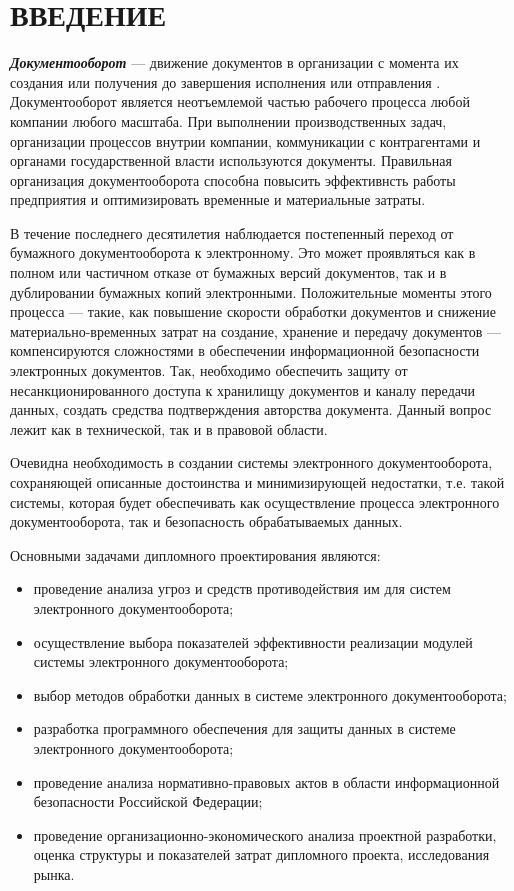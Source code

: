\chapter*{ВВЕДЕНИЕ}							%

\textbf{\textit{Документооборот}} --- движение документов в организации с момента их создания или получения до завершения исполнения или отправления \cite{gost51141}.
Документооборот является неотъемлемой частью рабочего процесса любой компании любого масштаба. При выполнении производственных задач, организации процессов внутрии компании, коммуникации с контрагентами и органами государственной власти используются документы. Правильная организация документооборота способна повысить эффективнсть работы предприятия и оптимизировать временные и материальные затраты.

\vspace{\baselineskip}
В течение последнего десятилетия наблюдается постепенный переход от бумажного документооборота к электронному. Это может проявляться как в полном или частичном отказе от бумажных версий документов, так и в дублировании бумажных копий электронными. Положительные моменты этого процесса --- такие, как повышение скорости обработки документов и снижение материально-временных затрат на создание, хранение и передачу документов --- компенсируются сложностями в обеспечении информационной безопасности электронных документов. Так, необходимо обеспечить защиту от несанкционированного доступа к хранилищу документов и каналу передачи данных, создать средства подтверждения авторства документа. Данный вопрос лежит как в технической, так и в правовой области.

\vspace{\baselineskip}
Очевидна необходимость в создании системы электронного документооборота, сохраняющей описанные достоинства и минимизирующей недостатки, т.е. такой системы, которая будет обеспечивать как осуществление процесса электронного документооборота, так и безопасность обрабатываемых данных.

\vspace{\baselineskip}
Основными задачами дипломного проектирования являются:
\begin{itemize}
  \item проведение анализа угроз и средств противодействия им для систем электронного документооборота;
  \item осуществление выбора показателей эффективности реализации модулей системы электронного документооборота;
  \item выбор методов обработки данных в системе электронного документооборота;
  \item разработка программного обеспечения для защиты данных в системе электронного документооборота;
  \item проведение анализа нормативно-правовых актов в области информационной безопасности Российской Федерации;
  \item проведение организационно-экономического анализа проектной разработки, оценка структуры и показателей затрат дипломного проекта, исследования рынка.
\end{itemize}

\clearpage